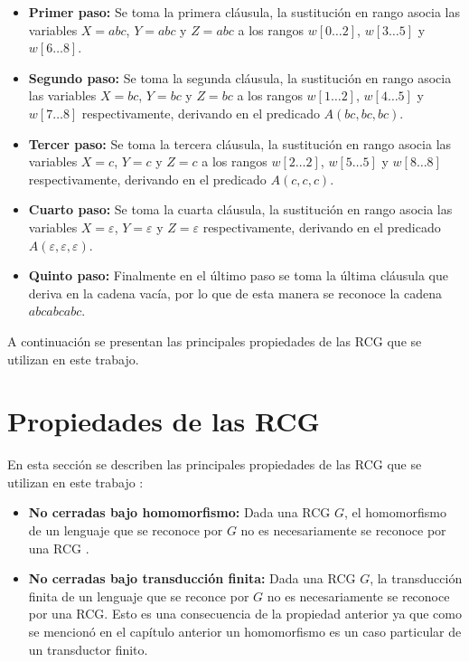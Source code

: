 \begin{itemize}
    \item \textbf{Primer paso:} Se toma la primera cláusula, la sustitución en rango asocia las variables
          $X=abc$, $Y=abc$ y $Z=abc$ a los rangos $w[0\dots 2]$, $w[3\dots 5]$ y $w[6\dots 8]$.
    \item \textbf{Segundo paso:} Se toma la segunda cláusula, la sustitución en rango asocia las variables $X=bc$, $Y=bc$ y $Z=bc$ a los rangos $w[1\dots 2]$,
          $w[4\dots 5]$ y $w[7\dots 8]$ respectivamente, derivando en el predicado $A(bc,bc,bc)$.
    \item \textbf{Tercer paso:} Se toma la tercera cláusula, la sustitución en rango asocia las variables $X=c$, $Y=c$ y $Z=c$ a los
          rangos $w[2\dots 2]$, $w[5\dots 5]$ y $w[8\dots 8]$ respectivamente, derivando en el predicado $A(c,c,c)$.
    \item \textbf{Cuarto paso:} Se toma la cuarta cláusula, la sustitución en rango asocia las variables
          $X=\varepsilon$, $Y=\varepsilon$ y $Z=\varepsilon$ respectivamente, derivando en el predicado
          $A(\varepsilon,\varepsilon,\varepsilon)$.
    \item \textbf{Quinto paso:} Finalmente en el último paso se toma la última
          cláusula que deriva en la cadena vacía, por lo que de esta manera se reconoce la cadena $abcabcabc$.
\end{itemize}

A continuación se presentan las principales propiedades de las RCG que se utilizan en este trabajo.

\section{Propiedades de las RCG}

En esta sección se describen las principales propiedades de las RCG que se utilizan en este trabajo \cite{propertiesRCGBib}:
\begin{itemize}
    \item  \textbf{No cerradas bajo homomorfismo:} Dada una RCG $G$, el homomorfismo de un lenguaje que se reconoce por $G$ no es necesariamente se reconoce por una RCG \cite{propertiesRCGBib}.
    \item \textbf{No cerradas bajo transducción finita:} Dada una RCG $G$, la transducción finita de un lenguaje que se reconce por $G$ no es necesariamente se reconoce por una RCG.  Esto es una consecuencia de la propiedad anterior ya que como se mencionó en el capítulo anterior un homomorfismo es un caso particular de un transductor finito.
\end{itemize}


